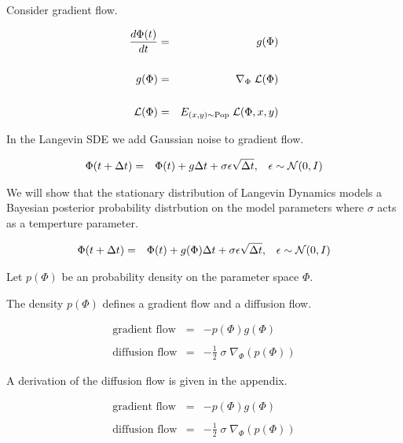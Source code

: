 {Consider gradient flow.

\begin{eqnarray*}
\frac{d\Phi(t)}{dt} & = & g(\Phi) \\
\\
g(\Phi) & = & \nabla_\Phi\;{\cal L}(\Phi) \\
\\
{\cal L}(\Phi) & = & E_{(x,y) \sim \mathrm{Pop}}\;{\cal L}(\Phi,x,y)
\end{eqnarray*}


In the Langevin SDE we add Gaussian noise to gradient flow.

\begin{eqnarray*}
\Phi(t + \Delta t) & = & \Phi(t) + g\Delta t + \sigma \epsilon \sqrt{\Delta t},\;\;\;\epsilon \sim {\cal N}(0,I)
\end{eqnarray*}

\vfill
We will show that the stationary distribution of Langevin Dynamics models a Bayesian posterior probability distrbution on
the model parameters where $\sigma$ acts as a temperture parameter.



\begin{eqnarray*}
\Phi(t + \Delta t) & = & \Phi(t) + g(\Phi)\Delta t + \sigma\epsilon \sqrt{\Delta t},\;\;\;\epsilon \sim {\cal N}(0,I)
\end{eqnarray*}

Let $p(\Phi)$ be an probability density on the parameter space $\Phi$.

\vfill
The density $p(\Phi)$ defines a gradient flow and a diffusion flow.

\begin{eqnarray*}
\mbox{gradient flow} & = & - p(\Phi)g(\Phi) \\
\\
\mbox{diffusion flow} & = & - \frac{1}{2} \;\sigma\;\nabla_\Phi(p(\Phi))
\end{eqnarray*}

A derivation of the diffusion flow is given in the appendix.


\begin{eqnarray*}
\mbox{gradient flow} & = & - p(\Phi)g(\Phi) \\
\\
\mbox{diffusion flow} & = & - \frac{1}{2} \;\sigma\;\nabla_\Phi(p(\Phi))
\end{eqnarray*}

}

